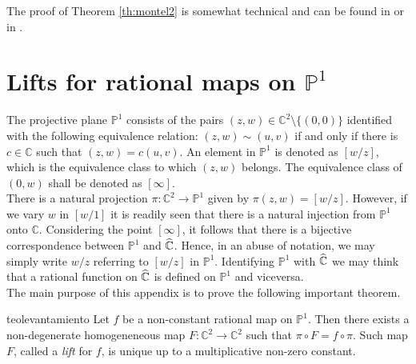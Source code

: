 The proof of Theorem \ref{th:montel2} is somewhat technical and can be found in \cite{beardon} or in \cite{milnordynamics}.\\

\section{Lifts for rational maps on $\mathbb{P}^1$}\label{p1}

The projective plane $\mathbb{P}^1$  consists of the pairs $(z,w)\in \mathbb{C}^2 \setminus\{(0,0)\}$ identified with the following equivalence relation: $(z,w)\sim (u,v)$ if and only if there is $c\in \mathbb{C}$ such that $(z,w)=c(u,v)$. An element in $\mathbb{P}^1$ is denoted as $[w/z]$, which is the equivalence class to which $(z,w)$ belongs. The equivalence class of $(0,w)$ shall be denoted as $[\infty]$.\\

There is a natural projection $\pi: \mathbb{C}^2 \rightarrow \mathbb{P}^1$ given by $\pi(z,w)=[w/z]$. However, if we vary $w$ in $[w/1]$ it is readily seen that there is a natural injection from $\mathbb{P}^1$ onto $\mathbb{C}$. Considering the point $[\infty]$, it follows that there is a bijective correspondence between $\mathbb{P}^1$ and $\widehat{\mathbb{C}}$. Hence, in an abuse of notation, we may simply write $w/z$ referring to $[w/z]$ in $\mathbb{P}^1$. Identifying $\mathbb{P}^1$ with $\widehat{\mathbb{C}}$ we may think that a rational function on $\widehat{\mathbb{C}}$ is defined on $\mathbb{P}^1$ and viceversa.\\

The main purpose of this appendix is to prove the following important theorem.

\begin{mytheo}{}{teolevantamiento}
Let $f$ be a non-constant rational map on $\mathbb{P}^1$. Then there exists a non-degenerate homogeneneous map $F:\mathbb{C}^2 \rightarrow \mathbb{C}^2$ such that $\pi\circ F = f \circ \pi$. Such map $F$, called a \emph{lift} for $f$, is unique up to a multiplicative non-zero constant. 
\end{mytheo}

